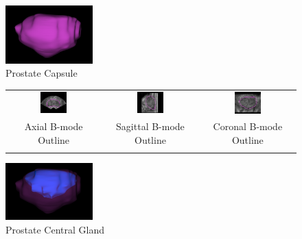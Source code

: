 \begin{figure}
\centering
\includegraphics[width=0.3\textwidth]{tyler/3D_capsule.png} \\
Prostate Capsule \\
\vspace{3 mm}
\begin{tabular}{ccc}
\includegraphics[width=0.3\textwidth]{tyler/axial_bmode.png} &
\includegraphics[width=0.3\textwidth]{tyler/sagittal_bmode.png} &
\includegraphics[width=0.3\textwidth]{tyler/coronal_bmode.png} \\
Axial B-mode Outline & Sagittal B-mode Outline & Coronal B-mode Outline \\
\vspace{5 mm}
\end{tabular}
\includegraphics[width=0.3\textwidth]{tyler/3D_CG.png} \\
Prostate Central Gland \\

\end{figure}
